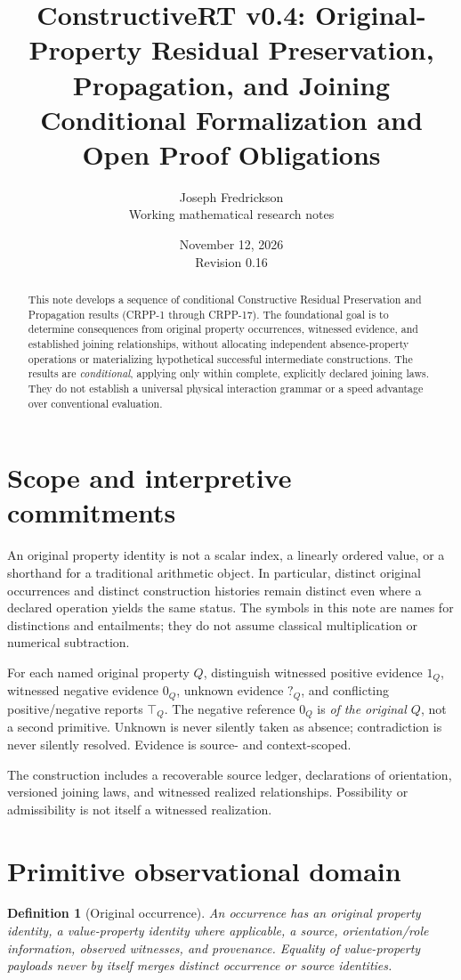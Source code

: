 \documentclass[11pt]{article}
\title{ConstructiveRT v0.4: Original-Property Residual Preservation, Propagation, and Joining\\
\large Conditional Formalization and Open Proof Obligations}
\author{Joseph Fredrickson\\Working mathematical research notes}
\date{November 12, 2026\\Revision 0.16}
\newtheorem{definition}{Definition}[section]
\begin{document}
\maketitle
\begin{abstract}
This note develops a sequence of conditional Constructive Residual Preservation and
Propagation results (CRPP-1 through CRPP-17). The foundational goal is to determine
consequences from original property occurrences, witnessed evidence, and established
joining relationships, without allocating independent absence-property operations or
materializing hypothetical successful intermediate constructions. The results are
\emph{conditional}, applying only within complete, explicitly declared joining laws.
They do not establish a universal physical interaction grammar or a speed advantage
over conventional evaluation.
\end{abstract}

\section{Scope and interpretive commitments}
An original property identity is not a scalar index, a linearly ordered value,
or a shorthand for a traditional arithmetic object. In particular,
distinct original occurrences and distinct construction histories remain
distinct even where a declared operation yields the same status.
The symbols in this note are names for distinctions and entailments; they do
not assume classical multiplication or numerical subtraction.

For each named original property $Q$, distinguish witnessed positive evidence
$1_Q$, witnessed negative evidence $0_Q$, unknown evidence $?_Q$,
and conflicting positive/negative reports $\top_Q$. The negative
reference $0_Q$ is \emph{of the original $Q$}, not a second primitive.
Unknown is never silently taken as absence; contradiction is never silently
resolved. Evidence is source- and context-scoped.

The construction includes a recoverable source ledger, declarations of
orientation, versioned joining laws, and witnessed realized relationships.
Possibility or admissibility is not itself a witnessed realization.

\section{Primitive observational domain}
\begin{definition}[Original occurrence]
An occurrence has an original property identity, a value-property identity
where applicable, a source, orientation/role information, observed witnesses,
and provenance. Equality of value-property payloads never by itself merges
distinct occurrence or source identities.
\end{definition}
\end{document}
